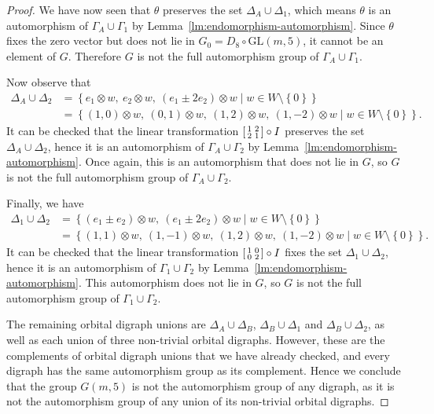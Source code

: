 \documentclass[ALCO, Unicode]{cedram}
\newcommand{\GL}{\mathrm{GL}}
\begin{document}
\begin{proof}
We have now seen that $\theta$ preserves the set $\Delta_A \cup \Delta_1$, which means $\theta$ is an automorphism of $\Gamma_A \cup \Gamma_1$ by Lemma~\ref{lm:endomorphism-automorphism}. Since $\theta$ fixes the zero vector but does not lie in $G_0 = D_8 \circ \GL{\left(m, 5 \right)}$, it cannot be an element of $G$. Therefore $G$ is not the full automorphism group of $\Gamma_A \cup \Gamma_1$.

Now observe that
\begin{align*}
\Delta_A \cup \Delta_2 &= \left\{e_1 \otimes w,\ e_2 \otimes w,\ \left(e_1 \pm 2 e_2 \right) \otimes w \mid w \in W \setminus \left\{0 \right\}\right\} \\
&= {\left\{\left(1, 0 \right) \otimes w,\ \left(0, 1 \right) \otimes w,\ \left(1, 2 \right) \otimes w,\ \left(1, -2 \right) \otimes w \mid w \in W \setminus \left\{0 \right\}\right\}}.
\end{align*}
It can be checked that the linear transformation $\begin{bsmallmatrix} 1 & 2 \\ 2 & 1 \end{bsmallmatrix} \circ I$ preserves the set $\Delta_A \cup \Delta_2$, hence it is an automorphism of $\Gamma_A \cup \Gamma_2$ by Lemma~\ref{lm:endomorphism-automorphism}. Once again, this is an automorphism that does not lie in $G$, so $G$ is not the full automorphism group of $\Gamma_A \cup \Gamma_2$.

Finally, we have
\begin{align*}
\Delta_1 \cup \Delta_2 &= \left\{\left(e_1 \pm e_2 \right) \otimes w,\ \left(e_1 \pm 2 e_2 \right) \otimes w \mid w \in W \setminus \left\{0 \right\}\right\} \\
&= {\left\{\left(1, 1 \right) \otimes w,\ \left(1, -1 \right) \otimes w,\ \left(1, 2 \right) \otimes w,\ \left(1, -2 \right) \otimes w \mid w \in W \setminus \left\{0 \right\}\right\}}.
\end{align*}
It can be checked that the linear transformation $\begin{bsmallmatrix} 1 & 0 \\ 0 & 2 \end{bsmallmatrix} \circ I$ fixes the set $\Delta_1 \cup \Delta_2$, hence it is an automorphism of $\Gamma_1 \cup \Gamma_2$ by Lemma~\ref{lm:endomorphism-automorphism}. This automorphism does not lie in $G$, so $G$ is not the full automorphism group of $\Gamma_1 \cup \Gamma_2$.

The remaining orbital digraph unions are $\Delta_A \cup \Delta_B$, $\Delta_B \cup \Delta_1$ and $\Delta_B \cup \Delta_2$, as well as each union of three non-trivial orbital digraphs. However, these are the complements of orbital digraph unions that we have already checked, and every digraph has the same automorphism group as its complement. Hence we conclude that the group $G{\left(m, 5 \right)}$ is not the automorphism group of any digraph, as it is not the automorphism group of any union of its non-trivial orbital digraphs.
\end{proof}
\end{document}
